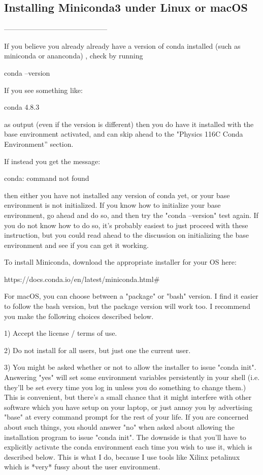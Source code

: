\subsection{Installing Miniconda3 under Linux or macOS}
--------------------------------------------

If you believe you already already have a version of conda installed
(such as miniconda or ananconda) , check by running

   conda --version

If you see something like:

  conda 4.8.3

as output (even if the version is different) then you do have it
installed with the base environment activated, and can skip ahead to
the "Physics 116C Conda Environment” section.

If instead you get the message:

   conda: command not found

then either you have not installed any version of conda yet, or your
base environment is not initialized.  If you know how to initialize
your base environment, go ahead and do so, and then try the "conda
--version" test again.  If you do not know how to do so, it's probably
easiest to just proceed with these instruction, but you could read
ahead to the discussion on initializing the base environment and see
if you can get it working.

To install Miniconda, download the appropriate installer for your OS
here:

  https://docs.conda.io/en/latest/miniconda.html\#

For macOS, you can choose between a "package" or "bash" version. I
find it easier to follow the bash version, but the package version
will work too. I recommend you make the following choices described
below.  

1) Accept the license / terms of use.

2) Do not install for all users, but just one the current user.

3) You might be asked whether or not to allow the installer to issue
"conda init".  Answering "yes" will set some environment variables
persistently in your shell (i.e. they'll be set every time you log in
unless you do something to change them.)  This is convenient, but
there's a small chance that it might interfere with other software
which you have setup on your laptop, or just annoy you by advertising
"base" at every command prompt for the rest of your life.  If you are
concerned about such things, you should answer "no" when asked about
allowing the installation program to issue "conda init".  The downside
is that you'll have to explicitly activate the conda environment each
time you wish to use it, which is described below.  This is what I do,
because I use tools like Xilinx petalinux which is *very* fussy about
the user environment.

